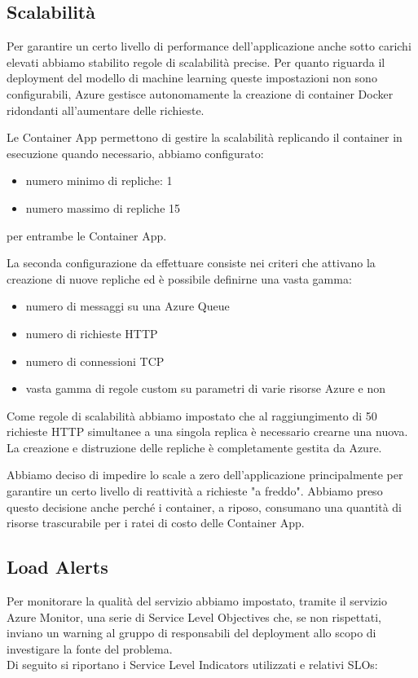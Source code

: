 \subsection{Scalabilità}
Per garantire un certo livello di performance dell'applicazione anche sotto carichi elevati abbiamo stabilito regole di scalabilità precise. Per quanto riguarda il deployment del modello di machine learning queste impostazioni non sono configurabili, Azure gestisce autonomamente la creazione di container Docker ridondanti all'aumentare delle richieste.

Le Container App permettono di gestire la scalabilità replicando il container in esecuzione quando necessario, abbiamo configurato:
\begin{itemize}
    \item numero minimo di repliche: 1
    \item numero massimo di repliche 15
\end{itemize}
per entrambe le Container App.

La seconda configurazione da effettuare consiste nei criteri che attivano la creazione di nuove repliche ed è possibile definirne una vasta gamma:
\begin{itemize}
    \item numero di messaggi su una Azure Queue
    \item numero di richieste HTTP
    \item numero di connessioni TCP
    \item vasta gamma di regole custom su parametri di varie risorse Azure e non
\end{itemize}

Come regole di scalabilità abbiamo impostato che al raggiungimento di 50 richieste HTTP simultanee a una singola replica è necessario crearne una nuova. La creazione e distruzione delle repliche è completamente gestita da Azure.

Abbiamo deciso di impedire lo scale a zero dell'applicazione principalmente per garantire un certo livello di reattività a richieste "a freddo". Abbiamo preso questo decisione anche perché i container, a riposo, consumano una quantità di risorse trascurabile per i ratei di costo delle Container App.

\subsection{Load Alerts}
Per monitorare la qualità del servizio abbiamo impostato, tramite il servizio Azure Monitor, una serie di Service Level Objectives che, se non rispettati, inviano un warning al gruppo di responsabili del deployment allo scopo di investigare la fonte del problema.\\
Di seguito si riportano i Service Level Indicators utilizzati e relativi SLOs:

